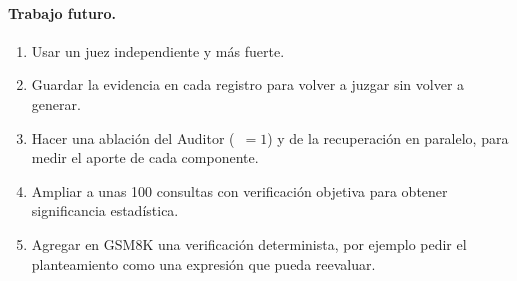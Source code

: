 \paragraph{Trabajo futuro.}
\begin{enumerate}
  \item Usar un juez independiente y más fuerte.
  \item Guardar la evidencia en cada registro para volver a juzgar sin volver a generar.
  \item Hacer una ablación del Auditor (~$=1$) y de la recuperación en paralelo, para medir el aporte de cada componente.
  \item Ampliar a unas 100 consultas con verificación objetiva para obtener significancia estadística.
  \item Agregar en GSM8K una verificación determinista, por ejemplo pedir el planteamiento como una expresión que  pueda reevaluar.
\end{enumerate}
